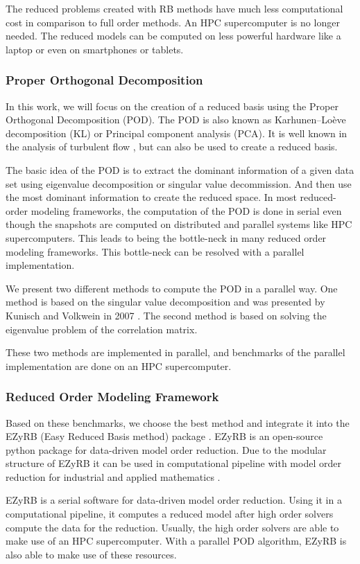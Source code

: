The reduced problems created with RB methods have much less computational cost in comparison to full order methods. An HPC supercomputer is no longer needed. The reduced models can be computed on less powerful hardware like a laptop or even on smartphones or tablets.

\subsubsection{Proper Orthogonal Decomposition}
In this work, we will focus on the creation of a reduced basis using the Proper Orthogonal Decomposition (POD).
The POD is also known as Karhunen–Loève decomposition (KL) or Principal component analysis (PCA).
It is well known in the analysis of turbulent flow \cite{holmes_lumley_berkooz_1996}, but can also be used to create a reduced basis.

The basic idea of the POD is to extract the dominant information of a given data set using eigenvalue decomposition or singular value decommission. And then use the most dominant information to create the reduced space.
In most reduced-order modeling frameworks, the computation of the POD is done in serial even though the snapshots are computed on distributed and parallel systems like HPC supercomputers.
This leads to being the bottle-neck in many reduced order modeling frameworks.
This bottle-neck can be resolved with a parallel implementation.

We present two different methods to compute the POD in a parallel way.
One method is based on the singular value decomposition and was presented by Kunisch and Volkwein in 2007 \cite{parapod}.
The second method is based on solving the eigenvalue problem of the correlation matrix.

These two methods are implemented in parallel, and benchmarks of the parallel implementation are done on an HPC supercomputer.

\subsubsection{Reduced Order Modeling Framework}

Based on these benchmarks, we choose the best method and integrate it into the EZyRB (Easy Reduced Basis method) package \cite{demo18ezyrb}.
EZyRB is an open-source python package for data-driven model order reduction.
Due to the modular structure of EZyRB it can be used in computational pipeline with model order reduction for industrial and applied mathematics \cite{Pipeline}. 

EZyRB is a serial software for data-driven model order reduction. Using it in a computational pipeline, it computes a reduced model after high order solvers compute the data for the reduction.
Usually, the high order solvers are able to make use of an HPC supercomputer.
With a parallel POD algorithm, EZyRB is also able to make use of these resources.






